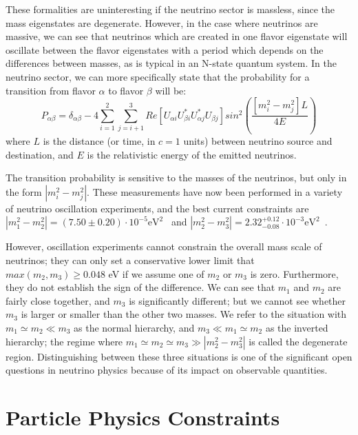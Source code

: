 These formalities are uninteresting if the neutrino sector is massless, since the mass eigenstates are degenerate.  However, in the case where neutrinos are massive, we can see that neutrinos which are created in one flavor eigenstate will oscillate between the flavor eigenstates with a period which depends on the differences between masses, as is typical in an N-state quantum system.  In the neutrino sector, we can more specifically state that the probability for a transition from flavor $\alpha$ to flavor $\beta$ will be:~\cite{RevModPhys.75.345}
\begin{equation}
P_{\alpha \beta} = \delta_{\alpha \beta} - 4 \sum_{i=1}^2 \sum_{j=i+1}^3 Re \left[ U_{\alpha i} U^{*}_{\beta i} U^{*}_{\alpha j} U_{\beta j} \right] sin^2 \left( \frac{ \left[m_i^2 - m_j^2\right]L}{4E} \right)
\end{equation}
where $L$ is the distance (or time, in $c=1$ units) between neutrino source and destination, and $E$ is the relativistic energy of the emitted neutrinos.

The transition probability is sensitive to the masses of the neutrinos, but only in the form $\left| m_i^2 - m_j^2\right|$.  These measurements have now been performed in a variety of neutrino oscillation experiments, and the best current constraints are $\left| m_1^2 - m_2^2 \right| = (7.50 \pm 0.20) \cdot 10^{-5} \text{eV}^2$~\cite{PhysRevD.83.052002} and $\left| m_2^2 - m_3^2 \right| = 2.32^{+0.12}_{-0.08} \cdot 10^{-3} \text{eV}^2$~\cite{PhysRevLett.106.181801}.

However, oscillation experiments cannot constrain the overall mass scale of neutrinos; they can only set a conservative lower limit that $max(m_2, m_3) \ge 0.048$ eV if we assume one of $m_2$ or $m_3$ is zero.  Furthermore, they do not establish the sign of the difference.  We can see that $m_1$ and $m_2$ are fairly close together, and $m_3$ is significantly different; but we cannot see whether $m_3$ is larger or smaller than the other two masses.  We refer to the situation with $m_1 \simeq m_2 \ll m_3$ as the normal hierarchy, and $m_3 \ll m_1 \simeq m_2$ as the inverted hierarchy; the regime where $m_1 \simeq m_2 \simeq m_3 \gg \left| m_2^2 - m_3^2 \right|$ is called the degenerate region.  Distinguishing between these three situations is one of the significant open questions in neutrino physics because of its impact on observable quantities.

\section{Particle Physics Constraints}\label{sec:ParticlePhysicsConstraints}

